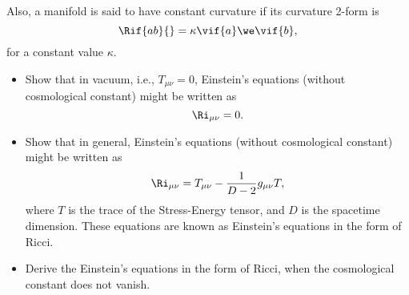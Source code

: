 Also, a manifold is said to have constant curvature if its curvature 2-form is
\begin{equation}
  \Rif{ab}{} = \kappa \vif{a}\we \vif{b},
\end{equation}
for a constant value $\kappa$.

\begin{Ebox}
  \begin{itemize}
  \item Show that in vacuum, i.e., $T_{\mu \nu} = 0$, Einstein's equations (without cosmological constant) might be written as
    \begin{equation}
      \Ri_{\mu \nu} = 0.
    \end{equation}
  \item Show that in general, Einstein's equations  (without cosmological constant) might be written as
    \begin{equation}
      \Ri_{\mu \nu} = T_{\mu \nu} - \frac{1}{D-2} g_{\mu \nu} T,
    \end{equation}
    where $T$ is the trace of the Stress-Energy tensor,  and  $D$ is the spacetime dimension. These equations are known as Einstein's equations in the form of Ricci.
  \item Derive the Einstein's equations in the form of Ricci, when the cosmological constant does not vanish.
  \end{itemize}
\end{Ebox}



